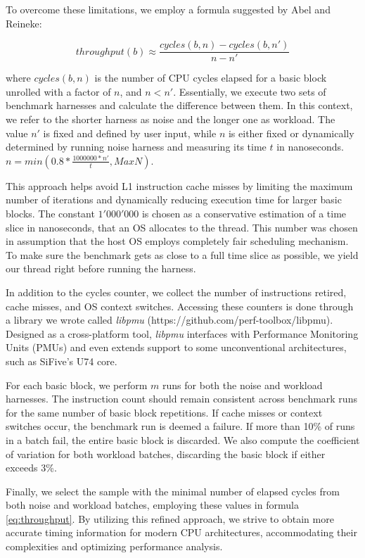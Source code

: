 To overcome these limitations, we employ a formula suggested by Abel and Reineke\cite{abelUiCAAccurateThroughput2022}:

\begin{equation}
throughput(b) \approx \frac{cycles(b, n) - cycles(b, n')}{n - n'}
  \label{eq:throughput}
\end{equation}

where $cycles(b, n)$ is the number of CPU cycles elapsed for a basic block unrolled with a factor of $n$, and $n < n'$. Essentially, we execute two sets of benchmark harnesses and calculate the difference between them. In this context, we refer to the shorter harness as noise and the longer one as workload. The value $n'$ is fixed and defined by user input, while $n$ is either fixed or dynamically determined by running noise harness and measuring its time $t$ in nanoseconds.
$n = min(0.8*\frac{1000000 * n'}{t}, MaxN)$.

This approach helps avoid L1 instruction cache misses by limiting the maximum number of iterations and dynamically reducing execution time for larger basic blocks. The constant $1'000'000$ is chosen as a conservative estimation of a time slice in nanoseconds, that an OS allocates to the thread. This number was chosen in assumption that the host OS employs completely fair scheduling mechanism. To make sure the benchmark gets as close to a full time slice as possible, we yield our thread right before running the harness.

In addition to the cycles counter, we collect the number of instructions retired, cache misses, and OS context switches. Accessing these counters is done through a library we wrote called \textit{libpmu} (https://github.com/perf-toolbox/libpmu). Designed as a cross-platform tool, \textit{libpmu} interfaces with Performance Monitoring Units (PMUs) and even extends support to some unconventional architectures, such as SiFive's U74 core.

For each basic block, we perform $m$ runs for both the noise and workload harnesses. The instruction count should remain consistent across benchmark runs for the same number of basic block repetitions. If cache misses or context switches occur, the benchmark run is deemed a failure. If more than 10\% of runs in a batch fail, the entire basic block is discarded. We also compute the coefficient of variation for both workload batches, discarding the basic block if either exceeds 3\%.

Finally, we select the sample with the minimal number of elapsed cycles from both noise and workload batches, employing these values in formula \ref{eq:throughput}. By utilizing this refined approach, we strive to obtain more accurate timing information for modern CPU architectures, accommodating their complexities and optimizing performance analysis.

